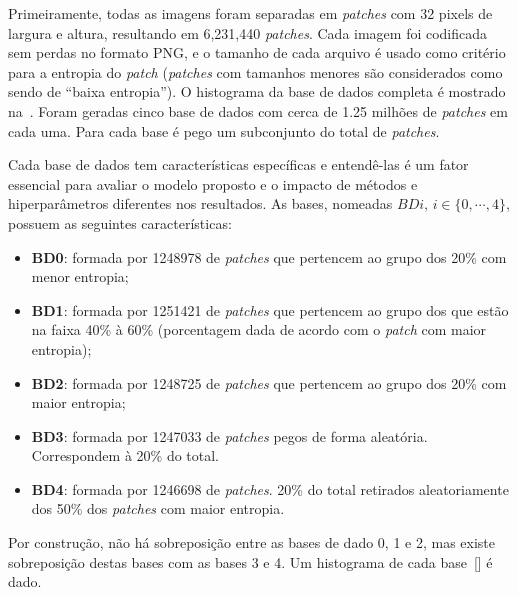 Primeiramente, todas as imagens foram separadas em \textit{patches} com 32 pixels de largura e altura, resultando em 6,231,440 \textit{patches}. Cada imagem foi codificada sem perdas no formato \acrshort{PNG}, e o tamanho de cada arquivo é usado como critério para a entropia do \textit{patch} (\textit{patches} com tamanhos menores são considerados como sendo de ``baixa entropia''). O histograma da base de dados completa é mostrado na~.
Foram geradas cinco base de dados com cerca de 1.25 milhões de \textit{patches} em cada uma. Para cada base é pego um subconjunto do total de \textit{patches}.

Cada base de dados tem características específicas e entendê-las é um fator essencial para avaliar o modelo proposto e o impacto de métodos e hiperparâmetros diferentes nos resultados. As bases, nomeadas $BDi,\, i \in \{0,\cdots,4\}$, possuem as seguintes características:
\begin{itemize}
    \item \textbf{BD0}: formada por 1248978 de \textit{patches} que pertencem ao grupo dos 20\% com menor entropia;
    \item \textbf{BD1}: formada por 1251421 de \textit{patches} que pertencem ao grupo dos que estão na faixa 40\% à 60\% (porcentagem dada de acordo com o \textit{patch} com maior entropia);
    \item \textbf{BD2}: formada por 1248725 de \textit{patches} que pertencem ao grupo dos 20\% com maior entropia;
    \item \textbf{BD3}: formada por 1247033 de \textit{patches} pegos de forma aleatória. Correspondem à 20\% do total.
    \item \textbf{BD4}: formada por 1246698 de \textit{patches}. 20\% do total retirados aleatoriamente dos 50\% dos \textit{patches} com maior entropia.
\end{itemize}
Por construção, não há sobreposição entre as bases de dado 0, 1 e 2, mas existe sobreposição destas bases com as bases 3 e 4. Um histograma de cada base~[] é dado.
